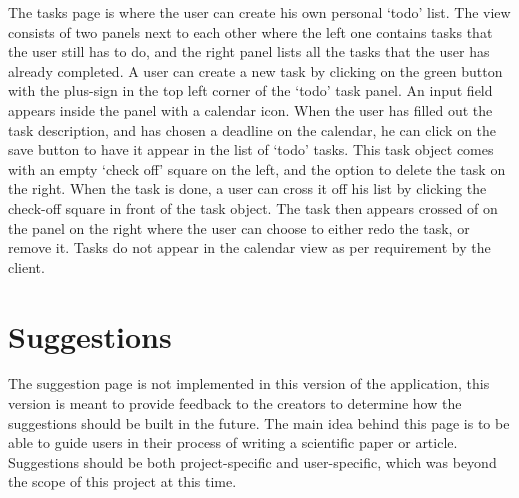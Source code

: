 The tasks page is where the user can create his own personal `todo' list. The view consists of two
panels next to each other where the left one contains tasks that the user still has to do,
and the right panel lists all the tasks that the user has already completed. A user can create
a new task by clicking on the green button with the plus-sign in the top left corner of the `todo' task
panel. An input field appears inside the panel with a calendar icon. When the user has filled out
the task description, and has chosen a deadline on the calendar, he can click on the save button to have
it appear in the list of `todo' tasks. This task object comes with an empty `check off' square on the left,
and the option to delete the task on the right. When the task is done, a user can cross it off his list by
clicking the check-off square in front of the task object. The task then appears crossed of on the panel on
the right where the user can choose to either redo the task, or remove it. Tasks do not appear in the calendar
view as per requirement by the client.

\section{Suggestions}

The suggestion page is not implemented in this version of the application, this version is meant to provide feedback to the creators
to determine how the suggestions should be built in the future. The main idea behind this page is to be able to guide users in their
process of writing a scientific paper or article. Suggestions should be both project-specific and user-specific, which was beyond
the scope of this project at this time.